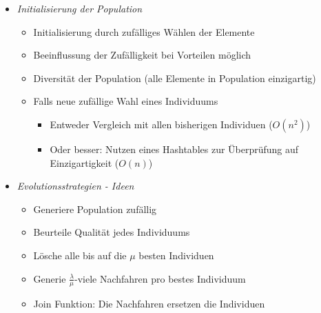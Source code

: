 \documentclass[
    12pt,
    a4paper,
    ngerman,
    color=3b,%
    marginpar=false,
    colorback=false,
    leqno,
]{tudaexercise}
\begin{document}
\begin{itemize}
\begin{itemize}
                \item \textit{Initialisierung der Population}
                    \begin{itemize}
                        \item Initialisierung durch zufälliges Wählen der Elemente
                        \item Beeinflussung der Zufälligkeit bei Vorteilen möglich
                        \item Diversität der Population (alle Elemente in Population einzigartig)
                        \item Falls neue zufällige Wahl eines Individuums
                            \begin{itemize}
                                \item Entweder Vergleich mit allen bisherigen Individuen ($O(n^2)$)
                                \item Oder besser: Nutzen eines Hashtables zur Überprüfung auf Einzigartigkeit ($O(n)$)
                            \end{itemize}
                    \end{itemize}
\clearpage
                \item \textit{Evolutionsstrategien - Ideen}
                    \begin{itemize}
                        \item Generiere Population zufällig
                        \item Beurteile Qualität jedes Individuums
                        \item Lösche alle bis auf die $\mu$ besten Individuen
                        \item Generie $\frac{\lambda}{\mu}$-viele Nachfahren pro bestes Individuum
                        \item Join Funktion: Die Nachfahren ersetzen die Individuen
                    \end{itemize}


\end{itemize}
\end{itemize}
\end{document}
